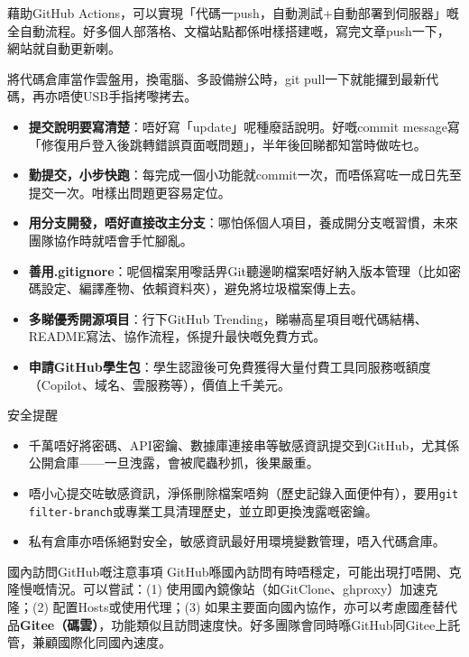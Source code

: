藉助GitHub Actions，可以實現「代碼一push，自動測試+自動部署到伺服器」嘅全自動流程。好多個人部落格、文檔站點都係咁樣搭建嘅，寫完文章push一下，網站就自動更新喇。


將代碼倉庫當作雲盤用，換電腦、多設備辦公時，git pull一下就能攞到最新代碼，再亦唔使USB手指拷嚟拷去。


\begin{itemize}
  \item \textbf{提交說明要寫清楚}：唔好寫「update」呢種廢話說明。好嘅commit message寫「修復用戶登入後跳轉錯誤頁面嘅問題」，半年後回睇都知當時做咗乜。
  \item \textbf{勤提交，小步快跑}：每完成一個小功能就commit一次，而唔係寫咗一成日先至提交一次。咁樣出問題更容易定位。
  \item \textbf{用分支開發，唔好直接改主分支}：哪怕係個人項目，養成開分支嘅習慣，未來團隊協作時就唔會手忙腳亂。
  \item \textbf{善用.gitignore}：呢個檔案用嚟話畀Git聽邊啲檔案唔好納入版本管理（比如密碼設定、編譯產物、依賴資料夾），避免將垃圾檔案傳上去。
  \item \textbf{多睇優秀開源項目}：行下GitHub Trending，睇嚇高星項目嘅代碼結構、README寫法、協作流程，係提升最快嘅免費方式。
  \item \textbf{申請GitHub學生包}：學生認證後可免費獲得大量付費工具同服務嘅額度（Copilot、域名、雲服務等），價值上千美元。
\end{itemize}

\begin{tcbwarn}{安全提醒}
\begin{itemize}
  \item 千萬唔好將密碼、API密鑰、數據庫連接串等敏感資訊提交到GitHub，尤其係公開倉庫——一旦洩露，會被爬蟲秒抓，後果嚴重。
  \item 唔小心提交咗敏感資訊，淨係刪除檔案唔夠（歷史記錄入面便仲有），要用\texttt{git filter-\allowbreak branch}或專業工具清理歷史，並立即更換洩露嘅密鑰。
  \item 私有倉庫亦唔係絕對安全，敏感資訊最好用環境變數管理，唔入代碼倉庫。
\end{itemize}

\end{tcbwarn}

\begin{tcbinfo}{國內訪問GitHub嘅注意事項}
GitHub喺國內訪問有時唔穩定，可能出現打唔開、克隆慢嘅情況。可以嘗試：(1) 使用國內鏡像站（如GitClone、ghproxy）加速克隆；(2) 配置Hosts或使用代理；(3) 如果主要面向國內協作，亦可以考慮國產替代品\textbf{Gitee（碼雲）}，功能類似且訪問速度快。好多團隊會同時喺GitHub同Gitee上託管，兼顧國際化同國內速度。

\end{tcbinfo}

